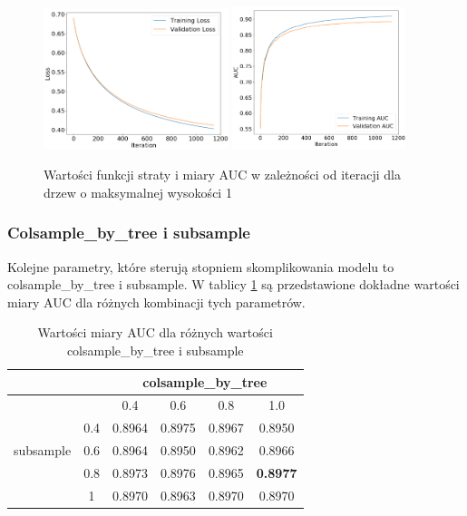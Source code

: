 \documentclass[12pt]{article}
\begin{document}
\begin{figure}[h]
    \centering
\includegraphics[width=0.48\textwidth]{xgboost/depth1_loss.png}
\includegraphics[width=0.45\textwidth]{xgboost/depth1_auc.png}
    \caption{Wartości funkcji straty i miary AUC w zależności od iteracji dla drzew o maksymalnej wysokości 1}
    \label{fig:xgboost_training_depth1}
\end{figure}

\subsubsection{Colsample\_by\_tree i subsample}

Kolejne parametry, które sterują stopniem skomplikowania modelu to colsample\_by\_tree i subsample. W tablicy \ref{tab:xgboost_sample} są przedstawione dokładne wartości miary AUC dla różnych kombinacji tych parametrów.

\begin{table}[h]
    \centering
    \begin{tabular}{|l|c|c|c|c|c|}
        \hline
         & &  \multicolumn{4}{c|}{colsample\_by\_tree}  \\ \hline
        \multirow{6}{*}{subsample} & & 0.4 & 0.6 & 0.8 & 1.0 \\ \cline{2 - 6}
& 0.4 & 0.8964 & 0.8975 & 0.8967 & 0.8950 \\ \cline{2 - 6} 
& 0.6 & 0.8964 & 0.8950 & 0.8962 & 0.8966 \\ \cline{2 - 6} 
& 0.8 & 0.8973 & 0.8976 & 0.8965 & \textbf{0.8977} \\ \cline{2 - 6} 
& 1 & 0.8970 & 0.8963 & 0.8970 & 0.8970 \\ \hline

    \end{tabular}
    \caption{Wartości miary AUC dla różnych wartości colsample\_by\_tree i subsample}
    \label{tab:xgboost_sample}
\end{table}
\end{document}
